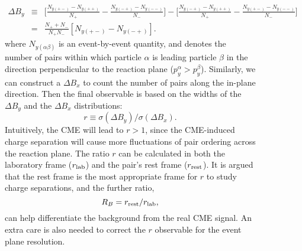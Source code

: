 \begin{figure}[htbp]
\begin{eqnarray}
\Delta B_y 
&\equiv& \Big[\frac{N_{y(+-)}-N_{y(++)}}{N_+} - \frac{N_{y(-+)}-N_{y(--)}}{N_-}\Big] - \Big[\frac{N_{y(-+)}-N_{y(++)}}{N_+} - \frac{N_{y(+-)}-N_{y(--)}}{N_-}\Big] \nonumber \\
&=& \frac{N_+ + N_-}{N_+N_-}[N_{y(+-)} - N_{y(-+)}].
\label{eq:by}
\end{eqnarray}
where $N_{y(\alpha\beta)}$ is an event-by-event quantity, and denotes the number of pairs within which particle $\alpha$ is leading particle $\beta$  in the direction perpendicular to the reaction plane ($p_y^\alpha > p_y^\beta$). Similarly, we can construct a $\Delta B_x$ to count the number of pairs along the in-plane direction. 
Then the final observable is based on the widths of the $\Delta B_y$ and the $\Delta B_x$ distributions:
\begin{equation}
r \equiv \sigma(\Delta B_y) / \sigma(\Delta B_x).
\label{rlab}
\end{equation}
Intuitively, the CME will lead to $r>1$, since the CME-induced charge separation will cause more fluctuations of pair ordering  across the reaction plane.
The ratio $r$ can be calculated in both the laboratory frame
($r_{\rm lab}$) and the pair's rest frame ($r_{\rm rest}$). It is argued that the
rest frame is the most appropriate frame for $r$ to study charge separations, and the further ratio,
\begin{equation}
R_B = r_{\rm rest} / r_{\rm lab},
\end{equation}
can help differentiate the background from the real CME signal. 
An extra care is also needed to correct the $r$ observable for the event plane resolution.
 

\end{figure}
